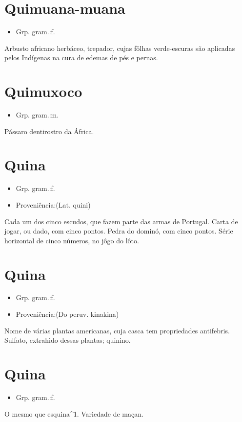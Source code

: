 \section{Quimuana-muana}
\begin{itemize}
\item {Grp. gram.:f.}
\end{itemize}
Arbusto africano herbáceo, trepador, cujas fôlhas verde-escuras são aplicadas pelos Indígenas na cura de edemas de pés e pernas.
\section{Quimuxoco}
\begin{itemize}
\item {Grp. gram.:m.}
\end{itemize}
Pássaro dentirostro da África.
\section{Quina}
\begin{itemize}
\item {Grp. gram.:f.}
\end{itemize}
\begin{itemize}
\item {Proveniência:(Lat. \textunderscore quini\textunderscore )}
\end{itemize}
Cada um dos cinco escudos, que fazem parte das armas de Portugal.
Carta de jogar, ou dado, com cinco pontos.
Pedra do dominó, com cinco pontos.
Série horizontal de cinco números, no jôgo do lôto.
\section{Quina}
\begin{itemize}
\item {Grp. gram.:f.}
\end{itemize}
\begin{itemize}
\item {Proveniência:(Do peruv. \textunderscore kinakina\textunderscore )}
\end{itemize}
Nome de várias plantas americanas, cuja casca tem propriedades antifebris.
Sulfato, extrahido dessas plantas; quinino.
\section{Quina}
\begin{itemize}
\item {Grp. gram.:f.}
\end{itemize}
O mesmo que \textunderscore esquina\textunderscore ^1.
Variedade de maçan.

